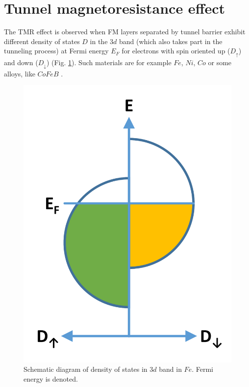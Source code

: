 \section{Tunnel magnetoresistance effect} \label{sec:PrinciplesTMR}

    The TMR effect is observed when FM layers separated by tunnel barrier exhibit different density of states $D$ in the $3d$ band (which also takes part in the tunneling process) at Fermi energy $E_F$ for electrons with spin oriented up ($D_\uparrow$) and down ($D_\downarrow$) (Fig. \ref{PrinciplesDOS}). Such materials are for example $Fe$, $Ni$, $Co$ or some alloys, like $CoFeB$ \cite{stobiecki2012urzadzenia}.
    
    \begin{figure}[H]
        \centering
        \includegraphics[width=0.20\paperwidth, page=1]{img/03/DOS_diagram.pdf}
        \caption{Schematic diagram of density of states in $3d$ band in $Fe$. Fermi energy is denoted.}
        \label{PrinciplesDOS}
    \end{figure} 
    
